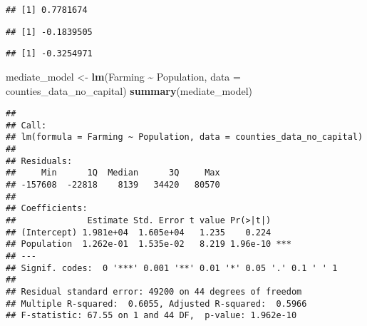 \documentclass[
]{article}
\newenvironment{Shaded}{\begin{snugshade}}{\end{snugshade}}
\newcommand{\AttributeTok}[1]{\textcolor[rgb]{0.13,0.29,0.53}{#1}}
\newcommand{\FunctionTok}[1]{\textcolor[rgb]{0.13,0.29,0.53}{\textbf{#1}}}
\newcommand{\NormalTok}[1]{#1}
\newcommand{\OtherTok}[1]{\textcolor[rgb]{0.56,0.35,0.01}{#1}}
\newcommand{\SpecialCharTok}[1]{\textcolor[rgb]{0.81,0.36,0.00}{\textbf{#1}}}
\newcommand{\StringTok}[1]{\textcolor[rgb]{0.31,0.60,0.02}{#1}}
\begin{document}
\begin{verbatim}
## [1] 0.7781674
\end{verbatim}

\begin{Shaded}
\end{Shaded}

\begin{verbatim}
## [1] -0.1839505
\end{verbatim}

\begin{Shaded}
\end{Shaded}

\begin{verbatim}
## [1] -0.3254971
\end{verbatim}

\begin{Shaded}
\begin{Highlighting}[]
\NormalTok{mediate\_model }\OtherTok{\textless{}{-}} \FunctionTok{lm}\NormalTok{(Farming }\SpecialCharTok{\textasciitilde{}}\NormalTok{ Population, }\AttributeTok{data =}\NormalTok{ counties\_data\_no\_capital)}
\FunctionTok{summary}\NormalTok{(mediate\_model)}
\end{Highlighting}
\end{Shaded}

\begin{verbatim}
## 
## Call:
## lm(formula = Farming ~ Population, data = counties_data_no_capital)
## 
## Residuals:
##     Min      1Q  Median      3Q     Max 
## -157608  -22818    8139   34420   80570 
## 
## Coefficients:
##              Estimate Std. Error t value Pr(>|t|)    
## (Intercept) 1.981e+04  1.605e+04   1.235    0.224    
## Population  1.262e-01  1.535e-02   8.219 1.96e-10 ***
## ---
## Signif. codes:  0 '***' 0.001 '**' 0.01 '*' 0.05 '.' 0.1 ' ' 1
## 
## Residual standard error: 49200 on 44 degrees of freedom
## Multiple R-squared:  0.6055, Adjusted R-squared:  0.5966 
## F-statistic: 67.55 on 1 and 44 DF,  p-value: 1.962e-10
\end{verbatim}
\end{document}
